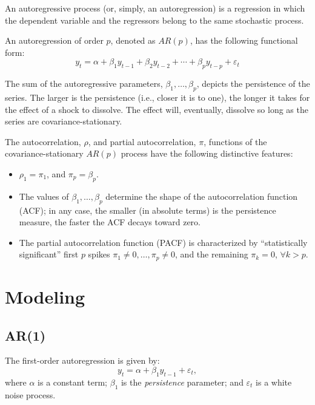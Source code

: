 \documentclass[
  12pt,
  oneside]{book}
\providecommand{\tightlist}{%
  \setlength{\itemsep}{0pt}\setlength{\parskip}{0pt}}
\begin{document}
An autoregressive process (or, simply, an autoregression) is a regression in which the dependent variable and the regressors belong to the same stochastic process.

An autoregression of order \(p\), denoted as \(AR(p)\), has the following functional form:
\[y_t = \alpha + \beta_1 y_{t-1}+\beta_2 y_{t-2}+ \cdots + \beta_p y_{t-p}+\varepsilon_t\]

The sum of the autoregressive parameters, \(\beta_1,\ldots,\beta_p\), depicts the persistence of the series. The larger is the persistence (i.e., closer it is to one), the longer it takes for the effect of a shock to dissolve. The effect will, eventually, dissolve so long as the series are covariance-stationary.

The autocorrelation, \(\rho\), and partial autocorrelation, \(\pi\), functions of the covariance-stationary \(AR(p)\) process have the following distinctive features:

\begin{itemize}
\tightlist
\item
  \(\rho_1 = \pi_1\), and \(\pi_p = \beta_p\).
\item
  The values of \(\beta_1,\ldots,\beta_p\) determine the shape of the autocorrelation function (ACF); in any case, the smaller (in absolute terms) is the persistence measure, the faster the ACF decays toward zero.
\item
  The partial autocorrelation function (PACF) is characterized by ``statistically significant'' first \(p\) spikes \(\pi_1 \neq 0,\ldots,\pi_p \neq 0\), and the remaining \(\pi_k = 0\), \(\forall k > p\).
\end{itemize}

\hypertarget{modeling-1}{%
\section{Modeling}\label{modeling-1}}

\hypertarget{ar1}{%
\subsection{AR(1)}\label{ar1}}

The first-order autoregression is given by: \[y_t = \alpha + \beta_1 y_{t-1} + \varepsilon_t,\] where \(\alpha\) is a constant term; \(\beta_1\) is the \emph{persistence} parameter; and \(\varepsilon_t\) is a white noise process.
\end{document}
